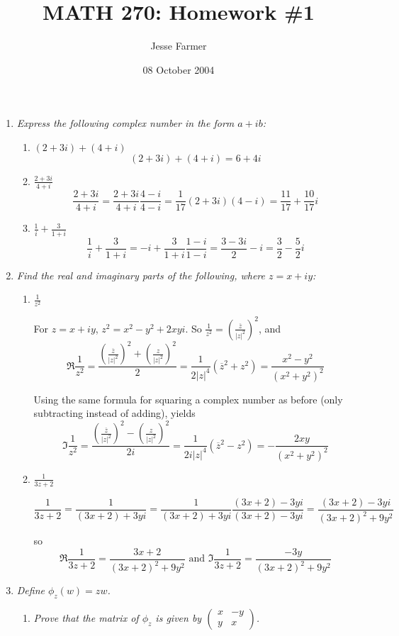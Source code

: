 \documentclass[letterpaper, 11pt]{article}
\title{MATH 270: Homework \#1}
\author{Jesse Farmer}
\date{08 October 2004}
\begin{document}
\maketitle
\begin{enumerate}

\item \emph{Express the following complex number in the form $a + ib$:}
\begin{enumerate}
\item \emph{$(2+3i) + (4+i)$}
\[
(2+3i) + (4+i) = 6 + 4i
\]
\item \emph{$\frac{2+3i}{4+i}$}
\[
\frac{2+3i}{4+i} = \frac{2+3i}{4+i} \frac{4-i}{4-i} = \frac{1}{17}(2+3i)(4-i) = \frac{11}{17} + \frac{10}{17}i
\]
\item \emph{$\frac{1}{i} + \frac{3}{1+i}$}
\[
\frac{1}{i} + \frac{3}{1+i} = -i + \frac{3}{1+i}\frac{1-i}{1-i} = \frac{3-3i}{2} - i = \frac{3}{2} - \frac{5}{2}i
\]
\end{enumerate}

\item \emph{Find the real and imaginary parts of the following, where $z = x + iy$:}
\begin{enumerate}
\item \emph{$\frac{1}{z^2}$}

For $z = x+iy$, $z^2 = x^2 - y^2 + 2xyi$.  So $\frac{1}{z^2} = \left( \frac{\overline{z}}{|z|^2} \right)^2$, and
\[
\Re \frac{1}{z^2} = \frac{\left( \frac{\overline{z}}{|z|^2} \right)^2 + \left( \frac{z}{|z|^2} \right)^2}{2} = \frac{1}{2|z|^4} (\overline{z}^2 + z^2) = \frac{x^2 - y^2}{\left(x^2 + y^2\right)^2}
\]

Using the same formula for squaring a complex number as before (only subtracting instead of adding), yields
\[
\Im \frac{1}{z^2} = \frac{\left( \frac{\overline{z}}{|z|^2} \right)^2 - \left( \frac{z}{|z|^2} \right)^2}{2i} = \frac{1}{2i|z|^4} (\overline{z}^2 - z^2) = - \frac{2xy}{\left(x^2 + y^2\right)^2}
\]
\item \emph{$\frac{1}{3z+2}$}

\[
\frac{1}{3z+2} = \frac{1}{(3x+2) + 3yi} = \frac{1}{(3x+2) + 3yi}\frac{(3x+2) - 3yi}{(3x+2) - 3yi} = \frac{(3x+2) - 3yi}{(3x+2)^2 + 9y^2}
\]

so
\[
\Re \frac{1}{3z+2} = \frac{3x+2}{(3x+2)^2 + 9y^2} \mbox{ and } \Im \frac{1}{3z+2} = \frac{-3y}{(3x+2)^2 + 9y^2}
\]
\end{enumerate}

\newpage

\item \emph{Define $\phi_z(w) = zw$.}
\begin{enumerate}
\item \emph{Prove that the matrix of $\phi_z$ is given by $\left(\begin{array}{cc} x & -y \\ y & x \end{array}\right)$.}


\end{enumerate}
\end{enumerate}
\end{document}
